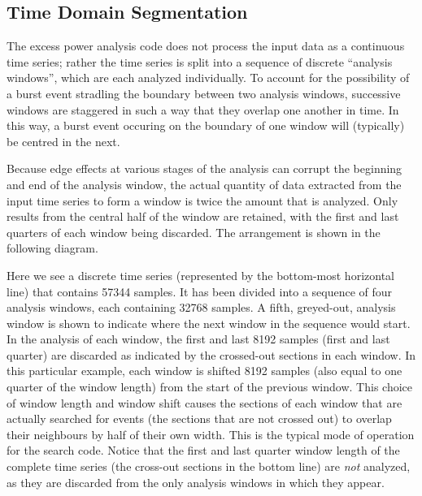 \documentclass{article}
\begin{document}
\subsection{Time Domain Segmentation}


The excess power analysis code does not process the input data as a
continuous time series;  rather the time series is split into a sequence of
discrete ``analysis windows'', which are each analyzed individually.  To
account for the possibility of a burst event stradling the boundary between
two analysis windows, successive windows are staggered in such a way that
they overlap one another in time.  In this way, a burst event occuring on
the boundary of one window will (typically) be centred in the next.

Because edge effects at various stages of the analysis can corrupt the
beginning and end of the analysis window, the actual quantity of data
extracted from the input time series to form a window is twice the amount
that is analyzed.  Only results from the central half of the window are
retained, with the first and last quarters of each window being discarded.
The arrangement is shown in the following diagram.
\begin{center}

\end{center}
Here we see a discrete time series (represented by the bottom-most
horizontal line) that contains 57344 samples.  It has been divided into a
sequence of four analysis windows, each containing 32768 samples.  A fifth,
greyed-out, analysis window is shown to indicate where the next window in
the sequence would start.  In the analysis of each window, the first and
last 8192 samples (first and last quarter) are discarded as indicated by
the crossed-out sections in each window.  In this particular example, each
window is shifted 8192 samples (also equal to one quarter of the window
length) from the start of the previous window.  This choice of window
length and window shift causes the sections of each window that are
actually searched for events (the sections that are not crossed out) to
overlap their neighbours by half of their own width.  This is the typical
mode of operation for the search code.  Notice that the first and last
quarter window length of the complete time series (the cross-out sections
in the bottom line) are \emph{not} analyzed, as they are discarded from the
only analysis windows in which they appear.
\end{document}
